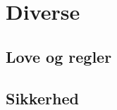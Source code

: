 \documentclass[Main]{subfiles}
\begin{document}
\chapter{Diverse}
\section{Love og regler}
\section{Sikkerhed}
\end{document}

